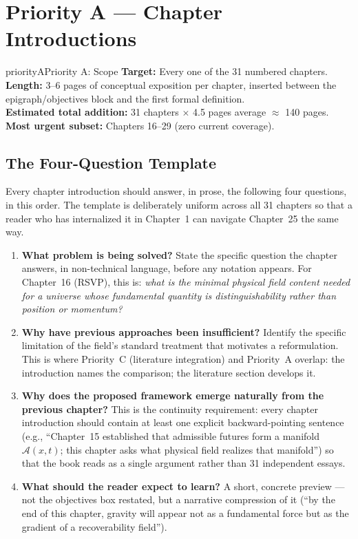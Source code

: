 \documentclass[11pt]{report}
\newcommand{\adm}{\mathcal{A}}
\begin{document}
\chapter{Priority A --- Chapter Introductions}
\label{ch:priority-a}

\begin{prioritybox}{priorityA}{Priority A: Scope}
\textbf{Target:} Every one of the 31 numbered chapters.\\
\textbf{Length:} 3--6 pages of conceptual exposition per
  chapter, inserted between the epigraph/objectives block and
  the first formal definition.\\
\textbf{Estimated total addition:} 31 chapters $\times$
  4.5 pages average $\approx$ 140 pages.\\
\textbf{Most urgent subset:} Chapters 16--29 (zero current
  coverage).
\end{prioritybox}

\section{The Four-Question Template}

Every chapter introduction should answer, in prose, the
following four questions, in this order. The template is
deliberately uniform across all 31 chapters so that a reader
who has internalized it in Chapter~1 can navigate Chapter~25
the same way.

\begin{enumerate}[label=\textbf{Q\arabic*.}, leftmargin=2.2em]
\item \textbf{What problem is being solved?} State the
  specific question the chapter answers, in non-technical
  language, before any notation appears. For Chapter~16
  (RSVP), this is: \textit{what is the minimal physical field
  content needed for a universe whose fundamental quantity is
  distinguishability rather than position or momentum?}
\item \textbf{Why have previous approaches been insufficient?}
  Identify the specific limitation of the field's standard
  treatment that motivates a reformulation. This is where
  Priority~C (literature integration) and Priority~A overlap:
  the introduction names the comparison; the literature section
  develops it.
\item \textbf{Why does the proposed framework emerge naturally
  from the previous chapter?} This is the continuity
  requirement: every chapter introduction should contain at
  least one explicit backward-pointing sentence (e.g.,
  ``Chapter~15 established that admissible futures form a
  manifold $\adm(x,t)$; this chapter asks what physical field
  realizes that manifold'') so that the book reads as a single
  argument rather than 31 independent essays.
\item \textbf{What should the reader expect to learn?} A short,
  concrete preview --- not the objectives box restated, but a
  narrative compression of it (``by the end of this chapter,
  gravity will appear not as a fundamental force but as the
  gradient of a recoverability field'').
\end{enumerate}
\end{document}
